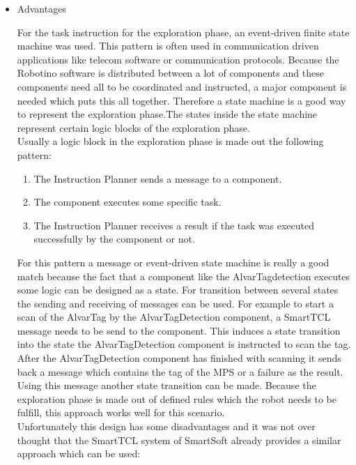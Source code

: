 \begin{itemize}

\item Advantages

For the task instruction for the exploration phase, an event-driven finite state machine was used. This pattern is often used in communication driven applications
like telecom software or communication protocols. Because the Robotino software is distributed between a lot of components and these components need all to be coordinated and instructed, a major component is needed which puts this all together. Therefore a state machine is a good way to represent the exploration phase.The states inside the state machine represent certain logic blocks of the exploration phase. \\


Usually a logic block in the exploration phase is made out the following pattern:

\begin{enumerate}

\item The Instruction Planner sends a message to a component.

\item The component executes some specific task.

\item The Instruction Planner receives a result if the task was executed successfully by the 
component or not.  


\end{enumerate}

For this pattern a message or event-driven state machine is really a good match because the fact that a component like the AlvarTagdetection executes some logic can be designed as a state. For transition between several states the sending and receiving of messages can be used. For example to start a scan of the AlvarTag by the AlvarTagDetection component, a SmartTCL message needs to be send to the component. This induces a state transition into the state the AlvarTagDetection component is instructed to scan the tag. After the AlvarTagDetection component has finished with scanning it sends back a message which contains the tag of the MPS or a failure as the result. Using this message another state transition can be made. Because the exploration phase is made out of defined rules which the robot needs to be fulfill, this approach works well for this scenario. \\


Unfortunately this design has some disadvantages and it was not over thought that the SmartTCL system of SmartSoft already provides a similar approach which can be used:



\end{itemize}
